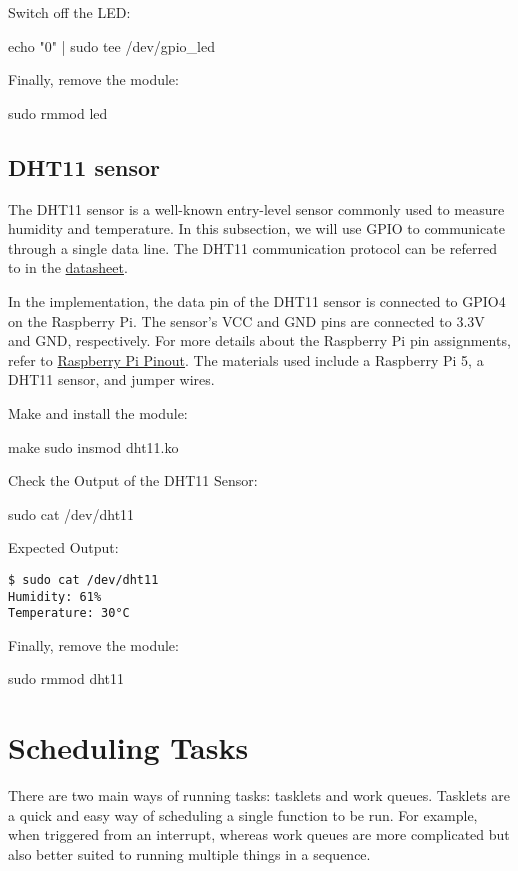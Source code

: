 \documentclass[10pt, oneside]{book}
\begin{document}
Switch off the LED:
\begin{codebash}
echo "0" | sudo tee /dev/gpio_led
\end{codebash}

Finally, remove the module:
\begin{codebash}
sudo rmmod led
\end{codebash}

\subsection{DHT11 sensor}
\label{sec:gpio_dht11}
The DHT11 sensor is a well-known entry-level sensor commonly used to measure humidity and temperature.
In this subsection, we will use GPIO to communicate through a single data line.
The DHT11 communication protocol can be referred to in the \href{https://www.mouser.com/datasheet/2/758/DHT11-Technical-Data-Sheet-Translated-Version-1143054.pdf?srsltid=AfmBOoppls-QTd864640bVtbK90sWBsFzJ_7SgjOD2EpwuLLGUSTyYnv}{datasheet}.

In the implementation, the data pin of the DHT11 sensor is connected to GPIO4 on the Raspberry Pi.
The sensor's VCC and GND pins are connected to 3.3V and GND, respectively.
For more details about the Raspberry Pi pin assignments, refer to \href{https://pinout.xyz/}{Raspberry Pi Pinout}.
The materials used include a Raspberry Pi 5, a DHT11 sensor, and jumper wires.

Make and install the module:
\begin{codebash}
make
sudo insmod dht11.ko
\end{codebash}

Check the Output of the DHT11 Sensor:
\begin{codebash}
sudo cat /dev/dht11 
\end{codebash}

Expected Output:
\begin{verbatim}
$ sudo cat /dev/dht11 
Humidity: 61%
Temperature: 30°C
\end{verbatim}

Finally, remove the module:
\begin{codebash}
sudo rmmod dht11
\end{codebash}

\section{Scheduling Tasks}
\label{sec:scheduling_tasks}
There are two main ways of running tasks: tasklets and work queues.
Tasklets are a quick and easy way of scheduling a single function to be run.
For example, when triggered from an interrupt,
whereas work queues are more complicated but also better suited to running multiple things in a sequence.
\end{document}
